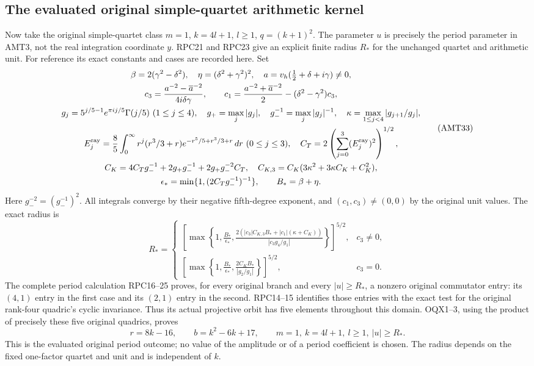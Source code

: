 \documentclass[11pt,a4paper]{article}
\begin{document}
\subsection{The evaluated original simple-quartet arithmetic kernel}
Now take the original simple-quartet class $m=1$, $k=4l+1$,
$l\ge1$, $q=(k+1)^2$. The parameter $u$ is precisely the period
parameter in AMT3, not the real integration coordinate $y$.
RPC21 and RPC23 give an explicit finite radius $R_*$ for the
unchanged quartet and arithmetic unit. For reference its exact
constants and cases are recorded here. Set
\[
\begin{gathered}
 \beta=2(\gamma^2-\delta^2),\quad\eta=(\delta^2+\gamma^2)^2,
 \quad a=v_h(\tfrac12+\delta+i\gamma)\ne0,\\
 c_3=\frac{a^{-2}-\overline a^{-2}}{4i\delta\gamma},\qquad
 c_1=\frac{a^{-2}+\overline a^{-2}}2-(\delta^2-\gamma^2)c_3,\\
 g_j=5^{j/5-1}e^{\pi ij/5}\Gamma(j/5)\ (1\le j\le4),\quad
 g_+=\max_j|g_j|,\quad g_-^{-1}=\max_j|g_j|^{-1},\quad
 \kappa=\max_{1\le j<4}|g_{j+1}/g_j|,\\
 E_j^{\rm ray}=\frac85\int_0^\infty r^j(r^3/3+r)
                  e^{-r^5/5+r^3/3+r}\,dr\ (0\le j\le3),\quad
 C_T=2\left(\sum_{j=0}^3(E_j^{\rm ray})^2\right)^{1/2},\\
 C_K=4C_Tg_-^{-1}+2g_+g_-^{-1}+2g_+g_-^{-2}C_T,\quad
 C_{K,3}=C_K(3\kappa^2+3\kappa C_K+C_K^2),\\
 \epsilon_*=\min\{1,(2C_Tg_-^{-1})^{-1}\},\qquad B_*=\beta+\eta.
\end{gathered}\tag{AMT33}
\]
Here $g_-^{-2}=(g_-^{-1})^2$. All integrals converge by their
negative fifth-degree exponent, and $(c_1,c_3)\ne(0,0)$ by the
original unit values. The exact radius is
\[
 R_*=
 \begin{cases}
 \displaystyle\left[\max\left\{1,\frac{B_*}{\epsilon_*},
 \frac{2(|c_3|C_{K,3}B_*+|c_1|(\kappa+C_K))}{|c_3g_4/g_1|}\right\}\right]^{5/2},
                  &c_3\ne0,\\[6pt]
 \displaystyle\left[\max\left\{1,\frac{B_*}{\epsilon_*},
                     \frac{2C_KB_*}{|g_2/g_1|}\right\}\right]^{5/2},
                  &c_3=0.
 \end{cases}\tag{AMT34}
\]
The complete period calculation RPC16--25 proves, for every original
branch and every $|u|\ge R_*$, a nonzero original commutator entry:
its $(4,1)$ entry in the first case and its $(2,1)$ entry in the
second. RPC14--15 identifies those entries with the exact test for
the original rank-four quadric's cyclic invariance. Thus its actual
projective orbit has five elements throughout this domain. OQX1--3,
using the product of precisely these five original quadrics, proves
\[
 \boxed{r=8k-16,\qquad b=k^2-6k+17,
        \qquad m=1,\ k=4l+1,\ l\ge1,\ |u|\ge R_*.}
 \tag{AMT35}
\]
This is the evaluated original period outcome; no value of the
amplitude or of a period coefficient is chosen. The radius depends
on the fixed one-factor quartet and unit and is independent of $k$.
\end{document}

